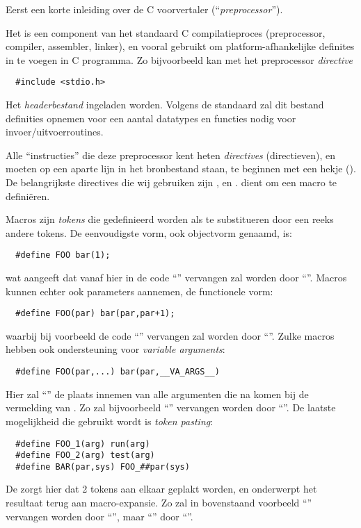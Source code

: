 Eerst een korte inleiding over de C voorvertaler (``{\em preprocessor}'').

Het is een component van het standaard C compilatieproces (preprocessor, compiler, assembler, linker), en vooral gebruikt om platform-afhankelijke definites in te voegen in C programma. Zo bijvoorbeeld kan met het preprocessor {\em directive} \begin{Verbatim}
  #include <stdio.h>
\end{Verbatim}
Het {\em headerbestand}  ingeladen worden. Volgens de standaard zal dit bestand definities opnemen voor een aantal datatypes en functies nodig voor invoer/uitvoerroutines. 

Alle ``instructies'' die deze preprocessor kent heten {\em directives} (directieven), en moeten op een aparte lijn in het bronbestand staan, te beginnen met een hekje (\code{\#}). De belangrijkste directives die wij gebruiken zijn , en .  dient om een macro te defini\"eren.

Macros zijn {\em tokens} die gedefinieerd worden als te substitueren door een reeks andere tokens. De eenvoudigste vorm, ook objectvorm genaamd, is: \begin{Verbatim}
  #define FOO bar(1);
\end{Verbatim}
wat aangeeft dat vanaf hier in de code ``'' vervangen zal worden door ``''. Macros kunnen echter ook parameters aannemen, de functionele vorm: \begin{Verbatim}
  #define FOO(par) bar(par,par+1);
\end{Verbatim}
waarbij bij voorbeeld de code ``'' vervangen zal worden door ``''. Zulke macros hebben ook ondersteuning voor {\em variable arguments}: \begin{Verbatim}
  #define FOO(par,...) bar(par,__VA_ARGS__)
\end{Verbatim}
Hier zal ``'' de plaats innemen van alle argumenten die na  komen bij de vermelding van . Zo zal bijvoorbeeld ``'' vervangen worden door ``''. De laatste mogelijkheid die gebruikt wordt is {\em token pasting}: \begin{Verbatim}
  #define FOO_1(arg) run(arg)
  #define FOO_2(arg) test(arg)
  #define BAR(par,sys) FOO_##par(sys)
\end{Verbatim}
De \code{\#\#} zorgt hier dat 2 tokens aan elkaar geplakt worden, en onderwerpt het resultaat terug aan macro-expansie. Zo zal in bovenstaand voorbeeld ``'' vervangen worden door ``'', maar ``'' door ``''.

